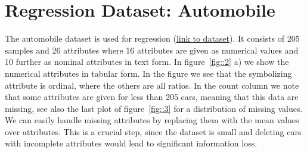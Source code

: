 \documentclass[11pt]{article}
\begin{document}
\section{Regression Dataset: Automobile}
The automobile dataset is used for regression (\href{https://archive.ics.uci.edu/ml/datasets/automobile}{link to dataset}). It consists of 205 samples and 26 attributes where 16 attributes are given as numerical values and 10 further as nominal attributes in text form. In figure~\ref{fig::2} a) we show the numerical attributes in tabular form. In the figure we see that the symbolizing attribute is ordinal, where the others are all ratios. In the count column we note that some attributes are given for less than 205 cars, meaning that this data are missing, see also the last plot of figure~\ref{fig::3} for a distribution of missing values. We can easily handle missing attributes by replacing them with the mean values over attributes. This is a crucial step, since the dataset is small and deleting cars with incomplete attributes would lead to significant information loss.  
%
\end{document}
